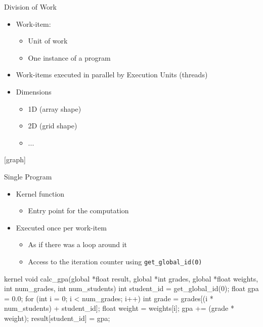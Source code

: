 \begin{frame}{Division of Work}

\begin{itemize}
    \item Work-item:
    \begin{itemize}
        \item Unit of work
        \item One instance of a program
    \end{itemize}
    \item Work-items executed in parallel by Execution Units (threads)
    \item Dimensions
    \begin{itemize}
        \item 1D (array shape)
        \item 2D (grid shape)
        \item ...
    \end{itemize}
\end{itemize}

[graph]

\end{frame}


\begin{frame}[fragile]{Single Program}

\begin{itemize}
    \item Kernel function
    \begin{itemize}
        \item Entry point for the computation
    \end{itemize}
    \item Executed once per work-item
    \begin{itemize}
        \item As if there was a loop around it
        \item Access to the iteration counter using \texttt{get\_global\_id(0)}
    \end{itemize}
\end{itemize}

\begin{codebox}
kernel void calc_gpa(global *float result, global *int grades, global *float weights,
                     int num_grades, int num_students) {
    int student_id = get_global_id(0);
    float gpa = 0.0;
    for (int i = 0; i < num_grades; i++) {
        int grade = grades[(i * num_students) + student_id];
        float weight = weights[i];
        gpa += (grade * weight);
    }
    result[student_id] = gpa;
}
\end{codebox}

\end{frame}

